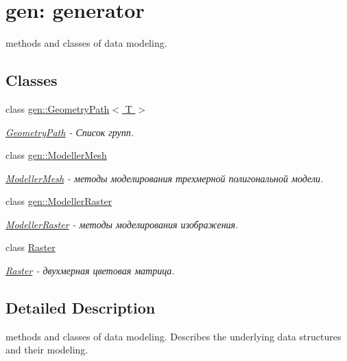 \hypertarget{group__generator}{\section{gen\-: generator}
\label{group__generator}
}


methods and classes of data modeling.  


\subsection*{Classes}
\begin{DoxyCompactItemize}
\item 
class \hyperlink{classgen_1_1_geometry_path}{gen\-::\-Geometry\-Path$<$ T $>$}
\begin{DoxyCompactList}\small\item\em \hyperlink{classgen_1_1_geometry_path}{Geometry\-Path} -\/ Список групп. \end{DoxyCompactList}\item 
class \hyperlink{classgen_1_1_modeller_mesh}{gen\-::\-Modeller\-Mesh}
\begin{DoxyCompactList}\small\item\em \hyperlink{classgen_1_1_modeller_mesh}{Modeller\-Mesh} -\/ методы моделирования трехмерной полигональной модели. \end{DoxyCompactList}\item 
class \hyperlink{classgen_1_1_modeller_raster}{gen\-::\-Modeller\-Raster}
\begin{DoxyCompactList}\small\item\em \hyperlink{classgen_1_1_modeller_raster}{Modeller\-Raster} -\/ методы моделирования изображения. \end{DoxyCompactList}\item 
class \hyperlink{struct_raster}{Raster}
\begin{DoxyCompactList}\small\item\em \hyperlink{struct_raster}{Raster} -\/ двухмерная цветовая матрица. \end{DoxyCompactList}\end{DoxyCompactItemize}


\subsection{Detailed Description}
methods and classes of data modeling. Describes the underlying data structures and their modeling. 